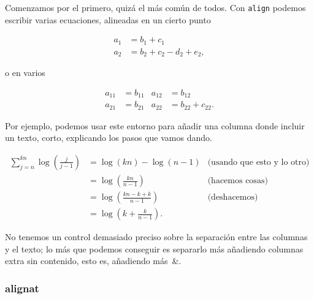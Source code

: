 \documentclass{article}
\numberwithin{equation}{section}
\theoremstyle{plain}
\theoremstyle{definition}
\theoremstyle{remark}
\begin{document}
Comenzamos por el primero, quizá el más común de todos. Con \texttt{align} podemos escribir varias ecuaciones, alineadas en un cierto punto
\begin{codigo-arriba}
	\begin{align}
		a_1 & = b_1 + c_1\\
		a_2 & = b_2 + c_2 - d_2 + e_2,
	\end{align}
\end{codigo-arriba}
o en varios
\begin{codigo-arriba}
	\begin{align}
	a_{11} & = b_{11} & a_{12} & = b_{12}\\
	a_{21} & = b_{21} & a_{22} & = b_{22}+c_{22}.
	\end{align}
\end{codigo-arriba}
Por ejemplo, podemos usar este entorno para añadir una columna donde incluir un texto, corto, explicando los pasos que vamos dando.
\begin{codigo-arriba}
	\begin{align*}
		\sum_{j=n}^{kn} \log\left( \frac{j}{j-1}\right) & =\log \left( kn\right)-\log \left( n-1\right) & \text{(usando que esto y lo otro)} \\
			& = \log \left( \frac{kn}{n-1}\right) & \text{(hacemos cosas)}\\
			& = \log \left( \frac{kn-k+k}{n-1}\right) & \text{(deshacemos)} \\
			& = \log\left( k+\frac{k}{n-1}\right) .
	\end{align*}
\end{codigo-arriba}	
No tenemos un control demasiado preciso sobre la separación entre las columnas y el texto; lo más que podemos conseguir es separarlo más añadiendo columnas extra sin contenido, esto es, añadiendo más~\&.

\subsubsection*{alignat}
\end{document}
